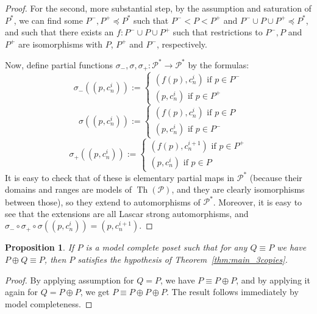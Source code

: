 \documentclass[final,a4paper,12pt]{amsart}
\DeclareMathOperator{\Th}{{Th}}
\newtheorem{prop}[thm]{Proposition}
\theoremstyle{remark}
\theoremstyle{definition}
\begin{document}
\begin{proof}
		For the second, more substantial step, by the assumption and saturation of $P^*$, we can find some $P^-,P^+\preceq P^*$ such that $P^-<P<P^+$ and $P^-\cup P\cup P^+\preceq P^*$, and such that there exists an $f\colon P^-\cup P\cup P^+$ such that restrictions to $P^-,P$ and $P^+$ are isomorphisms with $P$, $P^+$ and $P^-$, respectively.
		
		Now, define partial functions $\sigma_-,\sigma,\sigma_+\colon \mathcal P^*\to \mathcal P^*$ by the formulas:
		\[
		\sigma_-((p,c_n^i)):=\begin{cases} (f(p),c_n^i)\textrm{ if }p\in P^-\\ (p,c_n^i)\textrm{ if }p\in P^+ \end{cases}
		\]
		\[
		\sigma((p,c_n^i)):=\begin{cases} (f(p),c_n^i)\textrm{ if }p\in P\\ (p,c_n^i)\textrm{ if }p\in P^- \end{cases}
		\]
		\[
		\sigma_+((p,c_n^i)):=\begin{cases} (f(p),c_n^{i+1})\textrm{ if }p\in P^+\\ (p,c_n^i)\textrm{ if }p\in P \end{cases}
		\]
		It is easy to check that of these is elementary partial maps in $\mathcal P^*$ (because their domains and ranges are models of $\Th(\mathcal P)$, and they are clearly isomorphisms between those), so they extend to automorphisms of $\mathcal P^*$. Moreover, it is easy to see that the extensions are all Lascar strong automorphisms, and $\sigma_-\circ\sigma_+\circ\sigma((p,c_n^i))=(p,c_n^{i+1})$.
	\end{proof}
	
	\begin{prop}
		If $P$ is a model complete poset such that for any $Q\equiv P$ we have $P\oplus Q\equiv P$, then $P$ satisfies the hypothesis of Theorem~\ref{thm:main_3copies}.
	\end{prop}
	\begin{proof}
		By applying assumption for $Q=P$, we have $P\equiv P\oplus P$, and by applying it again for $Q=P\oplus P$, we get $P\equiv P\oplus P\oplus P$. The result follows immediately by model completeness.
	\end{proof}
	
\end{document}
